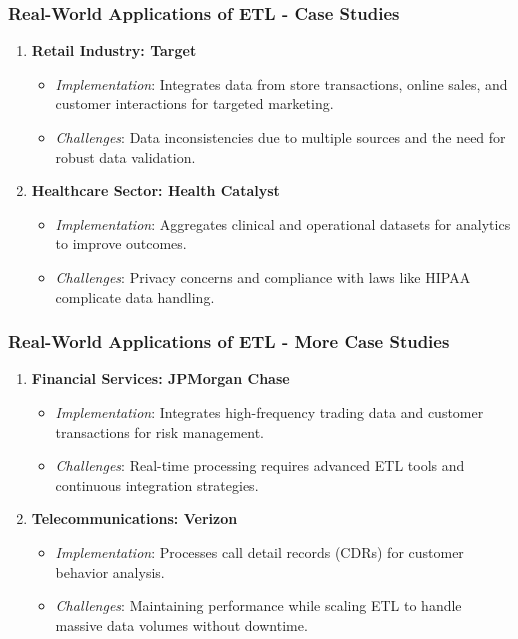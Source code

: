 \documentclass{beamer}
\begin{document}
\begin{frame}[fragile]
    \frametitle{Real-World Applications of ETL - Case Studies}
    \begin{enumerate}
        \item \textbf{Retail Industry: Target}
            \begin{itemize}
                \item \textit{Implementation}: Integrates data from store transactions, online sales, and customer interactions for targeted marketing.
                \item \textit{Challenges}: Data inconsistencies due to multiple sources and the need for robust data validation.
            \end{itemize}
        
        \item \textbf{Healthcare Sector: Health Catalyst}
            \begin{itemize}
                \item \textit{Implementation}: Aggregates clinical and operational datasets for analytics to improve outcomes.
                \item \textit{Challenges}: Privacy concerns and compliance with laws like HIPAA complicate data handling.
            \end{itemize}
    \end{enumerate}
\end{frame}

\begin{frame}[fragile]
    \frametitle{Real-World Applications of ETL - More Case Studies}
    \begin{enumerate}[resume]
        \item \textbf{Financial Services: JPMorgan Chase}
            \begin{itemize}
                \item \textit{Implementation}: Integrates high-frequency trading data and customer transactions for risk management.
                \item \textit{Challenges}: Real-time processing requires advanced ETL tools and continuous integration strategies.
            \end{itemize}

        \item \textbf{Telecommunications: Verizon}
            \begin{itemize}
                \item \textit{Implementation}: Processes call detail records (CDRs) for customer behavior analysis.
                \item \textit{Challenges}: Maintaining performance while scaling ETL to handle massive data volumes without downtime.
            \end{itemize}
    \end{enumerate}
\end{frame}
\end{document}
